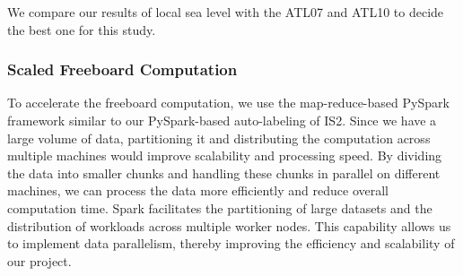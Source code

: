 We compare our results of local sea level with the ATL07 and ATL10 to decide the best one for this study. 














\subsubsection{Scaled Freeboard Computation}
To accelerate the freeboard computation, we use the map-reduce-based PySpark framework similar to our PySpark-based auto-labeling of IS2. 
Since we have a large volume of data, partitioning it and distributing the computation across multiple machines would improve scalability and processing speed. By dividing the data into smaller chunks and handling these chunks in parallel on different machines, we can process the data more efficiently and reduce overall computation time. 
Spark facilitates the partitioning of large datasets and the distribution of workloads across multiple worker nodes. This capability allows us to implement data parallelism, thereby improving the efficiency and scalability of our project.


